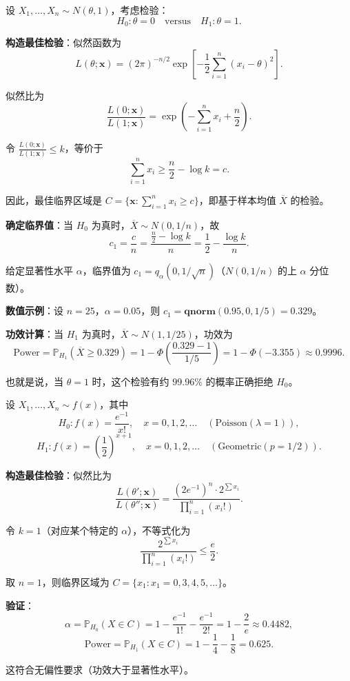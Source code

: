\begin{example}[正态均值差假设的最优检验]\label{ex:normal-mean-np}
设 $X_1, \ldots, X_n \sim N(\theta, 1)$，考虑检验：
\[
H_0: \theta = 0 \quad \text{versus} \quad H_1: \theta = 1.
\]

\textbf{构造最佳检验}：似然函数为
\[
L(\theta; \mathbf{x}) = (2\pi)^{-n/2} \exp\left[-\frac{1}{2}\sum_{i=1}^n (x_i - \theta)^2\right].
\]

似然比为
\[
\frac{L(0; \mathbf{x})}{L(1; \mathbf{x})} = \exp\left(-\sum_{i=1}^n x_i + \frac{n}{2}\right).
\]

令 $\frac{L(0; \mathbf{x})}{L(1; \mathbf{x})} \leq k$，等价于
\[
\sum_{i=1}^n x_i \geq \frac{n}{2} - \log k = c.
\]

因此，最佳临界区域是 $C = \{\mathbf{x}: \sum_{i=1}^n x_i \geq c\}$，即基于样本均值 $\overline{X}$ 的检验。

\textbf{确定临界值}：当 $H_0$ 为真时，$\overline{X} \sim N(0, 1/n)$，故
\[
c_1 = \frac{c}{n} = \frac{\frac{n}{2} - \log k}{n} = \frac{1}{2} - \frac{\log k}{n}.
\]

给定显著性水平 $\alpha$，临界值为 $c_1 = q_{\alpha}(0, 1/\sqrt{n})$（$N(0,1/n)$ 的上 $\alpha$ 分位数）。

\textbf{数值示例}：设 $n = 25$，$\alpha = 0.05$，则 $c_1 = \mathbf{qnorm}(0.95, 0, 1/5) = 0.329$。

\textbf{功效计算}：当 $H_1$ 为真时，$\overline{X} \sim N(1, 1/25)$，功效为
\[
\text{Power} = \mathbb{P}_{H_1}(\overline{X} \geq 0.329) = 1 - \Phi\left(\frac{0.329 - 1}{1/5}\right) = 1 - \Phi(-3.355) \approx 0.9996.
\]

也就是说，当 $\theta = 1$ 时，这个检验有约 $99.96\%$ 的概率正确拒绝 $H_0$。\end{example}

\begin{example}\label{ex:poisson-vs-geometric}
设 $X_1, \ldots, X_n \sim f(x)$，其中
\[
H_0: f(x) = \frac{e^{-1}}{x!}, \quad x = 0,1,2,\ldots \quad (\text{Poisson}(\lambda=1)),
\]
\[
H_1: f(x) = \left(\frac{1}{2}\right)^{x+1}, \quad x = 0,1,2,\ldots \quad (\text{Geometric}(p=1/2)).
\]

\textbf{构造最佳检验}：似然比为
\[
\frac{L(\theta'; \mathbf{x})}{L(\theta''; \mathbf{x})} = \frac{(2e^{-1})^n \cdot 2^{\sum x_i}}{\prod_{i=1}^n (x_i!)}.
\]

令 $k=1$（对应某个特定的 $\alpha$），不等式化为
\[
\frac{2^{\sum x_i}}{\prod_{i=1}^n (x_i!)} \leq \frac{e}{2}.
\]

取 $n=1$，则临界区域为 $C = \{x_1: x_1 = 0, 3, 4, 5, \ldots\}$。

\textbf{验证}：
\[
\alpha = \mathbb{P}_{H_0}(X \in C) = 1 - \frac{e^{-1}}{1!} - \frac{e^{-1}}{2!} = 1 - \frac{2}{e} \approx 0.4482,
\]
\[
\text{Power} = \mathbb{P}_{H_1}(X \in C) = 1 - \frac{1}{4} - \frac{1}{8} = 0.625.
\]

这符合无偏性要求（功效大于显著性水平）。\end{example}

